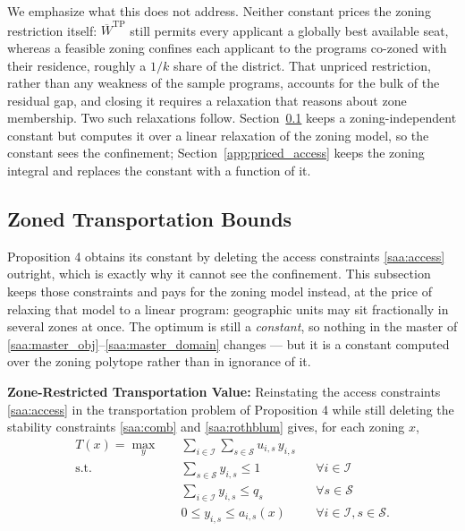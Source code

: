 \documentclass{article}
\begin{document}
We emphasize what this does not address. Neither constant prices the zoning restriction itself: $\overline{W}^{\mathrm{TP}}$ still permits every applicant a globally best available seat, whereas a feasible zoning confines each applicant to the programs co-zoned with their residence, roughly a $1/k$ share of the district. That unpriced restriction, rather than any weakness of the sample programs, accounts for the bulk of the residual gap, and closing it requires a relaxation that reasons about zone membership. Two such relaxations follow. Section~\ref{app:zoned_transport} keeps a zoning-independent constant but computes it over a linear relaxation of the zoning model, so the constant sees the confinement; Section~\ref{app:priced_access} keeps the zoning integral and replaces the constant with a function of it.

\subsection{Zoned Transportation Bounds}
\label{app:zoned_transport}

Proposition 4 obtains its constant by deleting the access constraints \eqref{saa:access} outright, which is exactly why it cannot see the confinement. This subsection keeps those constraints and pays for the zoning model instead, at the price of relaxing that model to a linear program: geographic units may sit fractionally in several zones at once. The optimum is still a \emph{constant}, so nothing in the master of \eqref{saa:master_obj}--\eqref{saa:master_domain} changes --- but it is a constant computed over the zoning polytope rather than in ignorance of it.

\noindent\textbf{Zone-Restricted Transportation Value:}
Reinstating the access constraints \eqref{saa:access} in the transportation problem of Proposition 4 while still deleting the stability constraints \eqref{saa:comb} and \eqref{saa:rothblum} gives, for each zoning $x$,
\begin{align}
T(x) = \max_{y} \quad & \sum_{i \in \mathcal{I}} \sum_{s \in \mathcal{S}} u_{i,s}\, y_{i,s} \label{eq:pa_restricted_obj} \\
\textrm{s.t.} \quad & \sum_{s \in \mathcal{S}} y_{i,s} \leq 1 && \forall i \in \mathcal{I} \label{eq:pa_restricted_assign} \\
& \sum_{i \in \mathcal{I}} y_{i,s} \leq q_s && \forall s \in \mathcal{S} \label{eq:pa_restricted_cap} \\
& 0 \leq y_{i,s} \leq a_{i,s}(x) && \forall i \in \mathcal{I}, s \in \mathcal{S}. \label{eq:pa_restricted_access}
\end{align}
\end{document}
